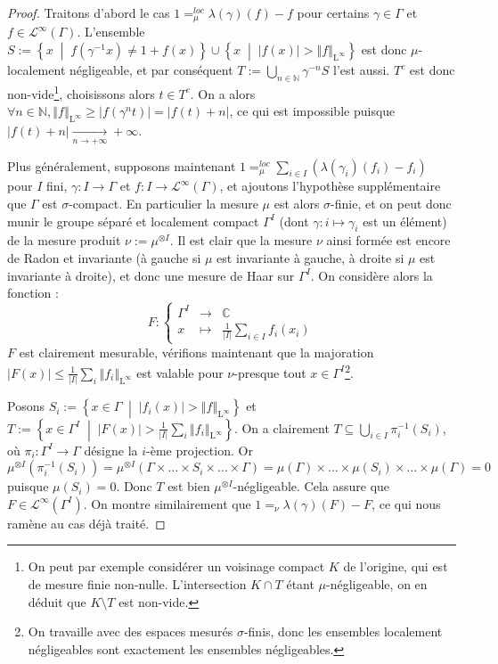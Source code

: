 \documentclass[a4paper,12pt]{article}
\newcommand{\N}{\mathbb{N}}
\newcommand{\C}{\mathbb{C}}
\newcommand{\norm}[1]{\left\Vert #1\right\Vert}
\newcommand{\abs}[1]{\left\vert#1\right\vert}
\newcommand{\card}[1]{\abs{#1}}
\newcommand{\set}[1]{\left\{ #1 \right\}}
\newcommand\fundef[3]{#1: \left\{\begin{array}{ccc}#2\\#3\end{array}\right.}
\newcommand{\tq}{\;\middle|\;}
\newcommand{\inv}{^{-1}}
\newcommand{\compl}{^c}
\begin{document}
\begin{proof}
    Traitons d'abord le cas $1 =_\mu^{loc} \lambda(\gamma)(f) - f$ pour certains $\gamma\in\Gamma$ et 
    $f\in \mathscr{L}^\infty(\Gamma)$. L'ensemble $S:=\set{x\tq f(\gamma\inv x)\ne 1+f(x)}\cup\set{x\tq\abs{f(x)}>\norm{f}_{\mathrm{L}^\infty}}$ est donc $\mu$-localement négligeable,
    et par conséquent $T := \bigcup_{n\in\N}\gamma^{-n}S$ l'est aussi. $T\compl$ est donc non-vide\footnote{On peut par exemple considérer un voisinage compact $K$
    de l'origine, qui est de mesure finie non-nulle. L'intersection $K\cap T$ étant $\mu$-négligeable, on en déduit que $K\setminus T$ est non-vide.}, choisissons alors $t\in T\compl$. On a alors 
    $\forall n\in\N, \norm{f}_{\mathrm{L}^\infty}\geq \abs{f(\gamma^{n}t)} = \abs{f(t) + n}$, ce qui est impossible puisque $\abs{f(t) + n}\xrightarrow[n\to+\infty]{}+\infty$.
    
    Plus généralement, supposons maintenant $1 =_\mu^{loc} \sum_{i\in I} (\lambda(\gamma_i)(f_i) - f_i)$ pour $I$ fini, $\gamma : I \to\Gamma$ et
    $f : I\to \mathscr{L}^\infty(\Gamma)$, et ajoutons l'hypothèse supplémentaire que $\Gamma$ est $\sigma$-compact. 
    En particulier la mesure $\mu$ est alors $\sigma$-finie, et on peut donc munir le groupe séparé et localement compact $\Gamma^I$ (dont $\gamma : i\mapsto \gamma_i$ est
    un élément) de la mesure produit $\nu:=\mu^{\otimes I}$. Il est clair que la mesure $\nu$ ainsi formée est encore 
    de Radon et invariante (à gauche si $\mu$ est invariante à gauche, à droite si $\mu$ est invariante à droite), et donc une mesure de Haar sur $\Gamma^I$. On considère alors la fonction :
    \begin{equation*}
        \fundef{F}{\Gamma^I&\to&\C}{x&\mapsto&\frac{1}{\card{I}}\sum_{i\in I}f_i(x_i)}
    \end{equation*}
    $F$ est clairement mesurable, vérifions maintenant que la majoration $\abs{F(x)}\le\frac1{\card{I}}\sum_i\norm{f_i}_{\mathrm{L}^\infty}$
    est valable pour $\nu$-presque tout $x\in\Gamma^I$\footnote{On travaille avec des espaces mesurés $\sigma$-finis, donc 
    les ensembles localement négligeables sont exactement les ensembles négligeables.}. 

    Posons $S_i:=\set{x\in\Gamma\tq \abs{f_i(x)}>\norm{f}_{\mathrm{L}^\infty}}$ et $T:=\set{x\in\Gamma^I\tq \abs{F(x)}>\frac1{\card{I}}\sum_i\norm{f_i}_{\mathrm{L}^\infty}}$. 
    On a clairement $T\subseteq\bigcup_{i\in I}\pi_i\inv(S_i)$, où $\pi_i:\Gamma^I\to\Gamma$ désigne la $i$-ème projection. 
    Or $\mu^{\otimes I}(\pi_i\inv(S_i)) = \mu^{\otimes I}(\Gamma\times\dots\times S_i\times\dots\times\Gamma)=\mu(\Gamma)\times\dots\times\mu(S_i)\times\dots\times\mu(\Gamma)=0$ puisque $\mu(S_i)=0$.
    Donc $T$ est bien $\mu^{\otimes I}$-négligeable.
    Cela assure que $F\in \mathscr{L}^\infty(\Gamma^I)$. 
    On montre similairement que $1 =_{\nu} \lambda(\gamma)(F) - F$, ce qui nous ramène au cas déjà traité. 


\end{proof}
\end{document}
